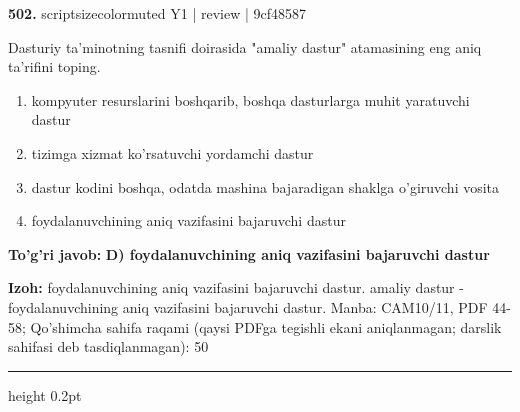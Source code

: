 \documentclass[10pt,a4paper]{article}
\begin{document}
{\bfseries\sffamily\color{ink} 502.} {scriptsizecolor{muted} Y1 | review | 9cf48587}
\par
Dasturiy ta'minotning tasnifi doirasida "amaliy dastur" atamasining eng aniq ta'rifini toping.
\begin{enumerate}[label=\Alph*),leftmargin=9mm]
\item kompyuter resurslarini boshqarib, boshqa dasturlarga muhit yaratuvchi dastur
\item tizimga xizmat ko'rsatuvchi yordamchi dastur
\item dastur kodini boshqa, odatda mashina bajaradigan shaklga o'giruvchi vosita
\item foydalanuvchining aniq vazifasini bajaruvchi dastur
\end{enumerate}
\begin{tcolorbox}[enhanced,breakable,colback=teal!4,colframe=teal!60!black,boxrule=0.45pt,arc=1.2mm,left=2.7mm,right=2.7mm,top=1.8mm,bottom=1.8mm,before skip=2mm,after skip=2mm]
{\bfseries\sffamily\color{teal}To'g'ri javob:} \textbf{D) foydalanuvchining aniq vazifasini bajaruvchi dastur}
\par\smallskip
{\bfseries Izoh:} foydalanuvchining aniq vazifasini bajaruvchi dastur. amaliy dastur - foydalanuvchining aniq vazifasini bajaruvchi dastur. Manba: CAM10/11, PDF 44-58; Qo'shimcha sahifa raqami (qaysi PDFga tegishli ekani aniqlanmagan; darslik sahifasi deb tasdiqlanmagan): 50
\end{tcolorbox}
\vspace{2mm}\hrule height 0.2pt\vspace{3mm}
\end{document}
